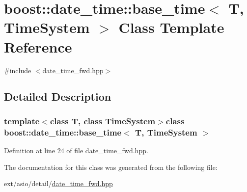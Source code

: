 \hypertarget{classboost_1_1date__time_1_1base__time}{}\section{boost\+:\+:date\+\_\+time\+:\+:base\+\_\+time$<$ T, Time\+System $>$ Class Template Reference}
\label{classboost_1_1date__time_1_1base__time}


{\ttfamily \#include $<$date\+\_\+time\+\_\+fwd.\+hpp$>$}



\subsection{Detailed Description}
\subsubsection*{template$<$class T, class Time\+System$>$class boost\+::date\+\_\+time\+::base\+\_\+time$<$ T, Time\+System $>$}



Definition at line 24 of file date\+\_\+time\+\_\+fwd.\+hpp.



The documentation for this class was generated from the following file\+:\begin{DoxyCompactItemize}
\item 
ext/asio/detail/\hyperlink{date__time__fwd_8hpp}{date\+\_\+time\+\_\+fwd.\+hpp}\end{DoxyCompactItemize}
